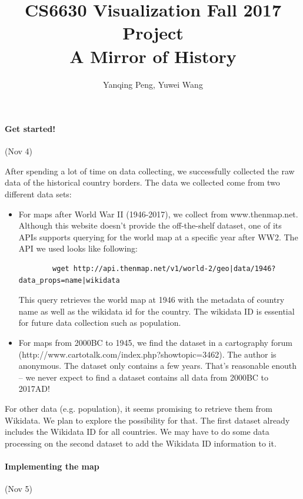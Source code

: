 \documentclass[12pt, fullpage,letterpaper]{article}
\title{CS6630 Visualization Fall 2017 Project \\ A Mirror of History}
\author{Yanqing Peng, Yuwei Wang}
\begin{document}
\maketitle
\newpage
\paragraph{Get started!} (Nov 4)

After spending a lot of time on data collecting, we successfully collected
the raw data of the historical country borders. The data we collected come
from two different data sets:

\begin{itemize}
    \item For maps after World War II (1946-2017), we collect from www.thenmap.net.
        Although this website doesn't provide the off-the-shelf dataset, one of its
        APIs supports querying for the world map at a specific year after WW2. The API
        we used looks like following:

        \begin{verbatim}
        wget http://api.thenmap.net/v1/world-2/geo|data/1946?data_props=name|wikidata
        \end{verbatim}

        This query retrieves the world map at 1946 with the metadata of country name as well as
        the wikidata id for the country. The wikidata ID is essential for future data collection
        such as population.

    \item For maps from 2000BC to 1945, we find the dataset in a cartography forum (http://www.cartotalk.com/index.php?showtopic=3462).
        The author is anonymous.
        The dataset only contains a few years. That's reasonable enouth -- we never expect to
        find a dataset contains all data from 2000BC to 2017AD!

\end{itemize}

For other data (e.g. population), it seems promising to retrieve them from Wikidata.
We plan to explore the possibility for that.
The first dataset already includes the Wikidata ID for all countries.
We may have to do some data processing on the second dataset to add the Wikidata ID information to it.

\newpage
\paragraph{Implementing the map} (Nov 5)
\end{document}
